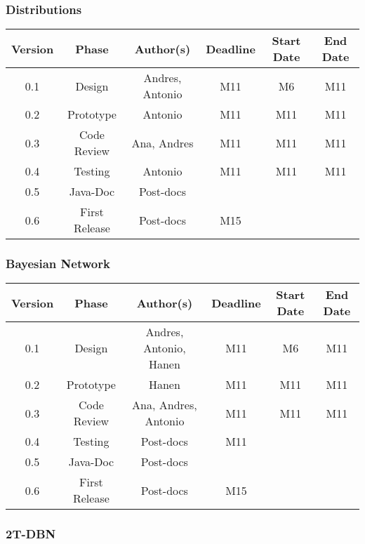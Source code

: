 \subsubsection*{Distributions}
\begin{table}[H]
\begin{tabular}{cccccc}
\hline
\textbf{Version} & \textbf{Phase} & \textbf{Author(s)} & \textbf{Deadline} & \textbf{Start Date} & \textbf{End Date}\\
\hline
0.1 & Design & Andres, Antonio &  M11 & M6 & M11\\
\hline 
0.2 & Prototype & Antonio & M11  & M11 & M11\\
\hline 
0.3 & Code Review & Ana, Andres & M11 & M11 & M11\\
\hline 
0.4 & Testing &  Antonio & M11  & M11  & M11\\
\hline 
0.5 & Java-Doc  & Post-docs &  &  & \\
\hline 
0.6 & First Release & Post-docs & M15 &  & \\
\hline
\end{tabular}
\end{table}


\subsubsection*{Bayesian Network}

\begin{table}[H]
\begin{tabular}{cccccc}
\hline
\textbf{Version} & \textbf{Phase} & \textbf{Author(s)} & \textbf{Deadline} & \textbf{Start Date} & \textbf{End Date}\\
\hline
0.1 & Design & Andres, Antonio, Hanen &  M11  & M6 & M11\\
\hline 
0.2 & Prototype & Hanen &  M11 & M11 & M11\\
\hline 
0.3 & Code Review & Ana, Andres, Antonio & M11  & M11  & M11\\
\hline 
0.4 & Testing & Post-docs & M11 &  & \\
\hline 
0.5 & Java-Doc  & Post-docs &  &  & \\
\hline 
0.6 & First Release & Post-docs & M15 &  & \\
\hline
\end{tabular}
\end{table}

\subsubsection*{2T-DBN}

